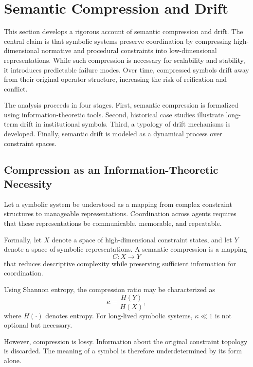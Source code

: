 \documentclass[11pt]{article}
\begin{document}
\section{Semantic Compression and Drift}

This section develops a rigorous account of semantic compression and drift. The
central claim is that symbolic systems preserve coordination by compressing
high-dimensional normative and procedural constraints into low-dimensional
representations. While such compression is necessary for scalability and
stability, it introduces predictable failure modes. Over time, compressed
symbols drift away from their original operator structure, increasing the risk
of reification and conflict.

The analysis proceeds in four stages. First, semantic compression is formalized
using information-theoretic tools. Second, historical case studies illustrate
long-term drift in institutional symbols. Third, a typology of drift mechanisms
is developed. Finally, semantic drift is modeled as a dynamical process over
constraint spaces.

\subsection{Compression as an Information-Theoretic Necessity}

Let a symbolic system be understood as a mapping from complex constraint
structures to manageable representations. Coordination across agents requires
that these representations be communicable, memorable, and repeatable.

Formally, let $X$ denote a space of high-dimensional constraint states, and let
$Y$ denote a space of symbolic representations. A semantic compression is a
mapping
\[
C : X \to Y
\]
that reduces descriptive complexity while preserving sufficient information for
coordination.

Using Shannon entropy, the compression ratio may be characterized as
\[
\kappa = \frac{H(Y)}{H(X)},
\]
where $H(\cdot)$ denotes entropy. For long-lived symbolic systems, $\kappa \ll 1$
is not optional but necessary.

However, compression is lossy. Information about the original constraint
topology is discarded. The meaning of a symbol is therefore underdetermined by
its form alone.
\end{document}
